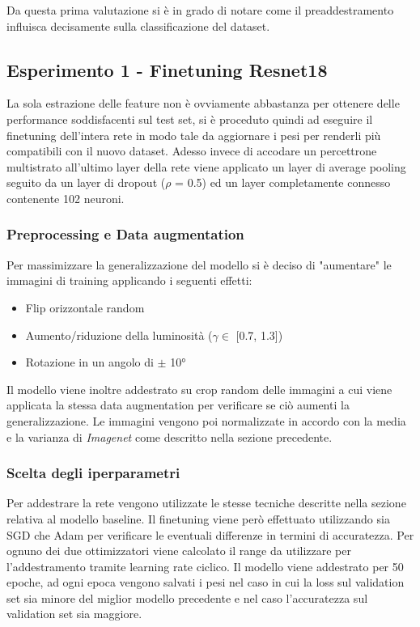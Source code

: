 Da questa prima valutazione si è in grado di notare come il preaddestramento influisca decisamente sulla classificazione del dataset.
\subsection{Esperimento 1 - Finetuning Resnet18}
La sola estrazione delle feature non è ovviamente abbastanza per ottenere delle performance soddisfacenti sul test set, si è proceduto quindi ad eseguire il finetuning dell'intera rete in modo tale da aggiornare i pesi per renderli più compatibili con il nuovo dataset.
Adesso invece di accodare un percettrone multistrato all'ultimo layer della rete viene applicato un layer di average pooling seguito da un layer di dropout ($\rho$ = 0.5) ed un layer completamente connesso contenente 102 neuroni.
\subsubsection{Preprocessing e Data augmentation}
Per massimizzare la generalizzazione del modello si è deciso di "aumentare" le immagini di training applicando i seguenti effetti:
\begin{itemize}
\item Flip orizzontale random
\item Aumento/riduzione della luminosità ($ \gamma \in $ [0.7, 1.3])
\item Rotazione in un angolo di $\pm$ 10°
\end{itemize}
Il modello viene inoltre addestrato su crop random delle immagini a cui viene applicata la stessa data augmentation per verificare se ciò aumenti la generalizzazione.
Le immagini vengono poi normalizzate in accordo con la media e la varianza di \textit{Imagenet} come descritto nella sezione precedente.
\subsubsection{Scelta degli iperparametri}
Per addestrare la rete vengono utilizzate le stesse tecniche descritte nella sezione relativa al modello baseline. Il finetuning viene però effettuato utilizzando sia SGD che Adam \cite{kingma2014adam} per verificare le eventuali differenze in termini di accuratezza.
Per ognuno dei due ottimizzatori viene calcolato il range da utilizzare per l'addestramento tramite learning rate ciclico.
Il modello viene addestrato per 50 epoche, ad ogni epoca vengono salvati i pesi nel caso in cui la loss sul validation set sia minore del miglior modello precedente e nel caso l'accuratezza sul validation set sia maggiore.
